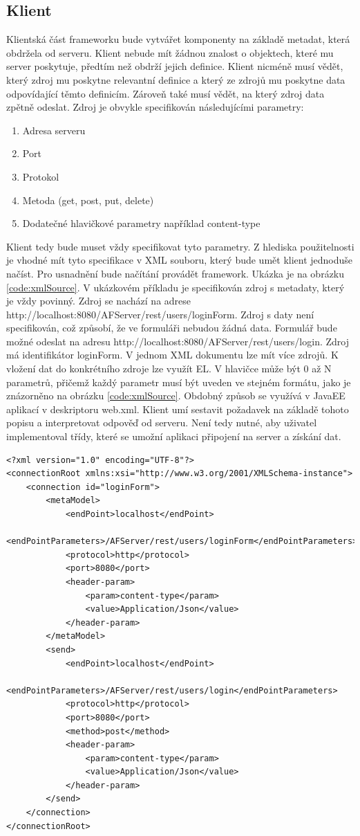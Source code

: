 \subsection{Klient}
Klientská část frameworku bude vytvářet komponenty na základě metadat, která obdržela od serveru. Klient nebude mít žádnou znalost o objektech, které mu server poskytuje, předtím než obdrží jejich definice. Klient nicméně musí vědět, který zdroj mu poskytne relevantní definice a který ze zdrojů mu poskytne data odpovídající těmto definicím. Zároveň také musí vědět, na který zdroj data zpětně odeslat. Zdroj je obvykle specifikován následujícími parametry:
\begin{enumerate}
\item Adresa serveru
\item Port
\item Protokol
\item Metoda (get, post, put, delete)
\item Dodatečné hlavičkové parametry například content-type
\end{enumerate}
Klient tedy bude muset vždy specifikovat tyto parametry. Z hlediska použitelnosti je vhodné mít tyto specifikace v XML souboru, který bude umět klient jednoduše načíst. Pro usnadnění bude načítání provádět framework. Ukázka je na obrázku \ref{code:xmlSource}. V ukázkovém příkladu je specifikován zdroj s metadaty, který je vždy povinný. Zdroj se nachází na adrese\\ http://localhost:8080/AFServer/rest/users/loginForm. Zdroj s daty není specifikován, což způsobí, že ve formuláři nebudou žádná data. Formulář bude možné odeslat na adresu http://localhost:8080/AFServer/rest/users/login. Zdroj má identifikátor loginForm. V jednom XML dokumentu lze mít více zdrojů. K vložení dat do konkrétního zdroje lze využít EL. V hlavičce může být 0 až N parametrů, přičemž každý parametr musí být uveden ve stejném formátu, jako je znázorněno na obrázku \ref{code:xmlSource}. Obdobný způsob se využívá v JavaEE aplikací v deskriptoru web.xml. Klient umí sestavit požadavek na základě tohoto popisu a interpretovat odpověď od serveru. Není tedy nutné, aby uživatel implementoval třídy, které se umožní aplikaci připojení na server a získání dat.

\begin{lstlisting}[caption=Ukázka XML specifikace zdrojů,
label={code:xmlSource}, basicstyle=\footnotesize]
<?xml version="1.0" encoding="UTF-8"?>
<connectionRoot xmlns:xsi="http://www.w3.org/2001/XMLSchema-instance">
	<connection id="loginForm">
		<metaModel>
			<endPoint>localhost</endPoint>
			<endPointParameters>/AFServer/rest/users/loginForm</endPointParameters>
			<protocol>http</protocol>
			<port>8080</port>
			<header-param>
				<param>content-type</param>
				<value>Application/Json</value>
			</header-param>
		</metaModel>
		<send>
			<endPoint>localhost</endPoint>
			<endPointParameters>/AFServer/rest/users/login</endPointParameters>
			<protocol>http</protocol>
			<port>8080</port>
			<method>post</method>
			<header-param>
				<param>content-type</param>
				<value>Application/Json</value>
			</header-param>
		</send>
	</connection>
</connectionRoot>
\end{lstlisting}


